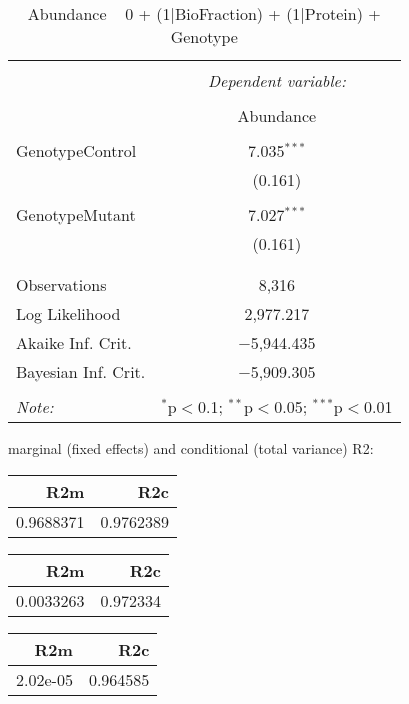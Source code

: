 \documentclass[11pt]{report}
\begin{document}
\begin{table}[!htbp] \centering 
  \caption{Abundance ~ 0 + (1|BioFraction) + (1|Protein) + Genotype} 
  \label{} 
\begin{tabular}{@{\extracolsep{5pt}}lc} 
\\[-1.8ex]\hline 
\hline \\[-1.8ex] 
 & \multicolumn{1}{c}{\textit{Dependent variable:}} \\ 
\cline{2-2} 
\\[-1.8ex] & Abundance \\ 
\hline \\[-1.8ex] 
 GenotypeControl & 7.035$^{***}$ \\ 
  & (0.161) \\ 
  & \\ 
 GenotypeMutant & 7.027$^{***}$ \\ 
  & (0.161) \\ 
  & \\ 
\hline \\[-1.8ex] 
Observations & 8,316 \\ 
Log Likelihood & 2,977.217 \\ 
Akaike Inf. Crit. & $-$5,944.435 \\ 
Bayesian Inf. Crit. & $-$5,909.305 \\ 
\hline 
\hline \\[-1.8ex] 
\textit{Note:}  & \multicolumn{1}{r}{$^{*}$p$<$0.1; $^{**}$p$<$0.05; $^{***}$p$<$0.01} \\ 
\end{tabular} 
\end{table} 
marginal (fixed effects) and conditional (total variance) R2:

\begin{tabular}{r|r}
\hline
R2m & R2c\\
\hline
0.9688371 & 0.9762389\\
\hline
\end{tabular}

\begin{tabular}{r|r}
\hline
R2m & R2c\\
\hline
0.0033263 & 0.972334\\
\hline
\end{tabular}

\begin{tabular}{r|r}
\hline
R2m & R2c\\
\hline
2.02e-05 & 0.964585\\
\hline
\end{tabular}
\end{document}
